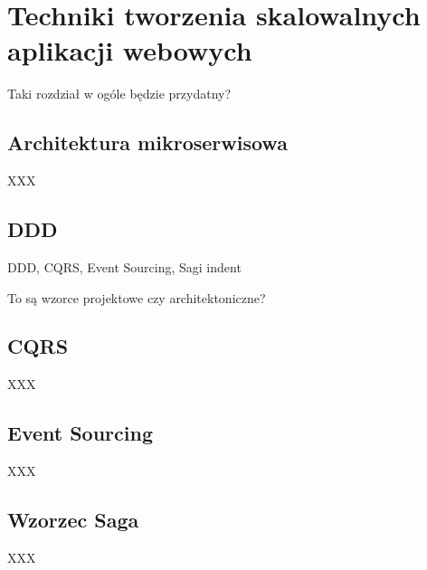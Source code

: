 \clearpage %
\section{Techniki tworzenia skalowalnych aplikacji webowych}

Taki rozdział w ogóle będzie przydatny?

\subsection{Architektura mikroserwisowa}

XXX

\subsection{DDD}

DDD, CQRS, Event Sourcing, Sagi indent

To są wzorce projektowe czy architektoniczne?

\subsection{CQRS}

XXX

\subsection{Event Sourcing}

XXX

\subsection{Wzorzec Saga}

XXX